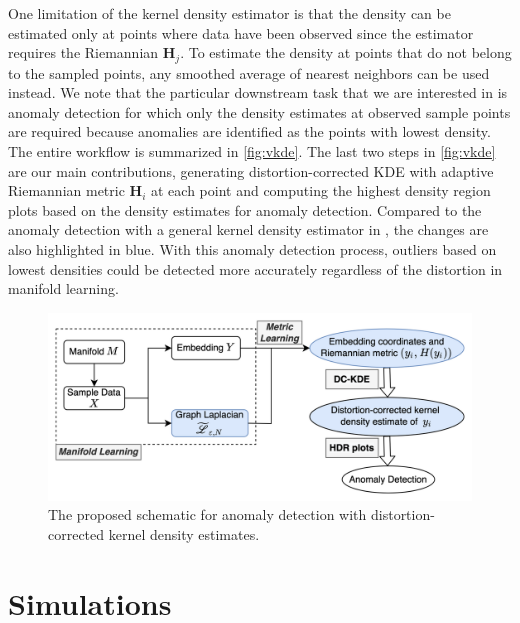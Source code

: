 \documentclass[11pt,a4paper,]{article}
\begin{document}
One limitation of the kernel density estimator is that the density can be estimated only at points where data have been observed since the estimator requires the Riemannian \(\pmb{H}_j\). To estimate the density at points that do not belong to the sampled points, any smoothed average of nearest neighbors can be used instead. We note that the particular downstream task that we are interested in is anomaly detection for which only the density estimates at observed sample points are required because anomalies are identified as the points with lowest density. The entire workflow is summarized in \autoref{fig:vkde}. The last two steps in \autoref{fig:vkde} are our main contributions, generating distortion-corrected KDE with adaptive Riemannian metric \(\pmb{H}_i\) at each point and computing the highest density region plots based on the density estimates for anomaly detection. Compared to the anomaly detection with a general kernel density estimator in \textcite{Cheng2021-ex}, the changes are also highlighted in blue. With this anomaly detection process, outliers based on lowest densities could be detected more accurately regardless of the distortion in manifold learning.



\begin{figure}

{\centering \includegraphics[width=0.95\linewidth]{figures/DC-KDE} 

}

\caption{The proposed schematic for anomaly detection with distortion-corrected kernel density estimates.}\label{fig:vkde}
\end{figure}

\hypertarget{simulation}{%
\section{Simulations}\label{simulation}}
\end{document}

